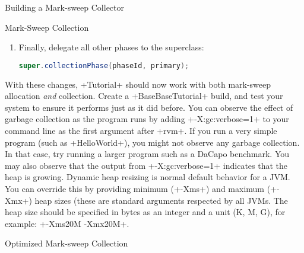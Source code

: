 \begin{chapter}{Building a Mark-sweep Collector}
\begin{section}{Mark-Sweep Collection}
\begin{enumerate}
\begin{enumerate}
\begin{enumerate}
\begin{lstlisting}[language=Java]
}
            \end{lstlisting}
          \item Finally, delegate all other phases to the superclass:
            \begin{lstlisting}[language=Java]
super.collectionPhase(phaseId, primary);
            \end{lstlisting}
        \end{enumerate}
    \end{enumerate}
\end{enumerate}

With these changes, \spverb+Tutorial+ should now work with both mark-sweep allocation \textit{and} collection. Create a \spverb+BaseBaseTutorial+ build, and test your system to ensure it performs just as it did before. You can observe the effect of garbage collection as the program runs by adding \spverb+-X:gc:verbose=1+ to your command line as the first argument after \spverb+rvm+. If you run a very simple program (such as \spverb+HelloWorld+), you might not observe any garbage collection. In that case, try running a larger program such as a DaCapo benchmark. You may also observe that the output from \spverb+-X:gc:verbose=1+ indicates that the heap is growing. Dynamic heap resizing is normal default behavior for a JVM. You can override this by providing minimum (\spverb+-Xms+) and maximum (\spverb+-Xmx+) heap sizes (these are standard arguments respected by all JVMs. The heap size should be specified in bytes as an integer and a unit (K, M, G), for example: \spverb+-Xms20M -Xmx20M+.

\end{section}

\begin{section}{Optimized Mark-sweep Collection}


\end{section}
\end{chapter}
